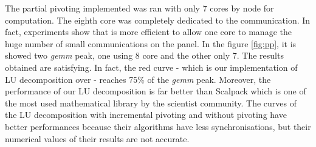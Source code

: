 The partial pivoting implemented was ran with only 7 cores by node for computation. The eighth core was completely dedicated to the communication. In fact, experiments show that is more efficient to allow one core to manage the huge number of small communications on the panel. In the figure \ref{fig:pp}, it is showed two \emph{gemm} peak, one using 8 core and the other only 7. The results obtained are satisfying. In fact, the red curve - which is our implementation of LU decomposition over \dague - reaches 75\% of the \emph{gemm} peak. Moreover, the performance of our LU decomposition is far better than Scalpack which is one of the most used mathematical library by the scientist community. The curves of the LU decomposition with incremental pivoting and without pivoting have better performances because their algorithms have less synchronisations, but their numerical values of their results are not accurate.



